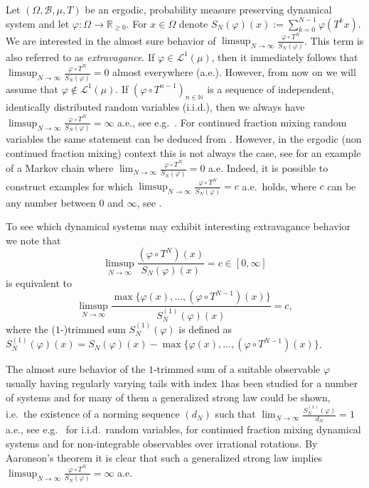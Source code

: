 \documentclass[11pt]{amsart}
\theoremstyle{definition}
\numberwithin{equation}{section}
\begin{document}
Let $(\Omega,\mathcal{B},\mu,T)$ be an ergodic,  probability measure preserving dynamical system and let $\varphi:\Omega \to\mathbb{R}_{\geq 0}$. 
 For $x\in \Omega$ denote $S_N(\varphi)(x):=\sum_{k=0}^{N-1}\varphi(T^kx)$. 
 We are interested in the almost sure behavior of $\limsup_{N\to\infty}\frac{\varphi\circ T^N}{S_N(\varphi)}$. This term is also referred to as \emph{extravagance}. If $\varphi\in \mathcal{L}^1(\mu)$, then it immediately follows that $\limsup_{N\to\infty}\frac{\varphi\circ T^N}{S_N(\varphi)}=0$
almost everywhere (a.e.). However, from now on we will assume that $\varphi\notin \mathcal{L}^1(\mu)$. If $(\varphi\circ T^{n-1})_{n\in\mathbb{N}}$ is a sequence of independent, identically distributed random variables (i.i.d.), then we always have 
$\limsup_{N\to\infty}\frac{\varphi\circ T^N}{S_N(\varphi)}=\infty$ a.e., see e.g.\ \cite{kesten}. For continued fraction mixing random variables the same statement can be deduced from \cite[Thm.\ 4 and following remark]{occu_times}. 
However, in the ergodic (non continued fraction mixing) context this is not always the case, see \cite[Ex.~a]{tanny} for an example of a Markov chain where $\lim_{N\to\infty}\frac{\varphi\circ T^N}{S_N(\varphi)}=0$ a.e.
Indeed, it is possible to construct examples 
for which $\limsup_{N\to\infty}\frac{\varphi\circ T^N}{S_N(\varphi)} =c$ a.e.\ holds, where $c$ can be any number between $0$ and $\infty$, see \cite{aaro_nak}. 

To see which dynamical systems may exhibit interesting extravagance behavior we note that 
$$\limsup_{N\to\infty}\frac{(\varphi\circ T^N)(x)}{S_N(\varphi)(x)}=c\in[0,\infty]$$ is equivalent to $$\limsup_{N\to\infty} \frac{\max\{\varphi(x),\ldots, (\varphi\circ T^{N-1})(x)\}}{S_N^{(1)}(\varphi)(x)}=c,$$ where the ($1$-)trimmed sum $S_N^{(1)}(\varphi)$ is defined as $S_N^{(1)}(\varphi)(x)=S_N(\varphi)(x)-\max\{\varphi(x),\ldots, (\varphi\circ T^{N-1})(x)\}$. 

The almost sure behavior of the $1$-trimmed sum of a suitable observable $\varphi$ usually having regularly varying tails with index $1$has been studied for a number of systems and for many of them a generalized strong law could be shown, i.e.\ the existence of a norming sequence $(d_N)$ such that
$\lim_{N\to\infty}\frac{S_N^{(1)}(\varphi)}{d_N}=1$ a.e., see e.g.\ \cite{mori} for i.i.d.\ random variables, \cite{diam_vaal, aaro_nak_trim} for continued fraction mixing dynamical systems and \cite{au_schi} for non-integrable observables over irrational rotations. By Aaronson's theorem it is clear that such a generalized strong law implies $\limsup_{N\to\infty} \frac{\varphi\circ T^N}{S_N(\varphi)}=\infty$ a.e.
\end{document}
